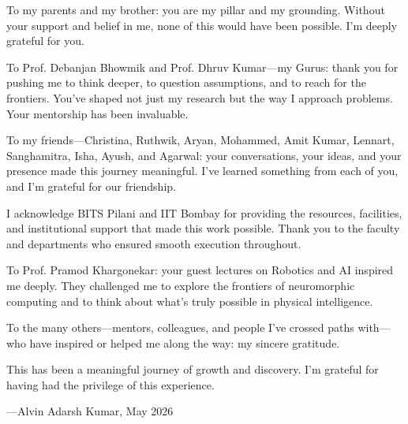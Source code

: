 
To my parents and my brother: you are my pillar and my grounding. Without your support and belief in me, none of this would have been possible. I'm deeply grateful for you.

To Prof. Debanjan Bhowmik and Prof. Dhruv Kumar—my Gurus: thank you for pushing me to think deeper, to question assumptions, and to reach for the frontiers. You've shaped not just my research but the way I approach problems. Your mentorship has been invaluable.

To my friends—Christina, Ruthwik, Aryan, Mohammed, Amit Kumar, Lennart, Sanghamitra, Isha, Ayush, and Agarwal: your conversations, your ideas, and your presence made this journey meaningful. I've learned something from each of you, and I'm grateful for our friendship.

I acknowledge BITS Pilani and IIT Bombay for providing the resources, facilities, and institutional support that made this work possible. Thank you to the faculty and departments who ensured smooth execution throughout.

To Prof. Pramod Khargonekar: your guest lectures on Robotics and AI inspired me deeply. They challenged me to explore the frontiers of neuromorphic computing and to think about what's truly possible in physical intelligence.

To the many others—mentors, colleagues, and people I've crossed paths with—who have inspired or helped me along the way: my sincere gratitude.

This has been a meaningful journey of growth and discovery. I'm grateful for having had the privilege of this experience.

---Alvin Adarsh Kumar, May 2026

\clearpage